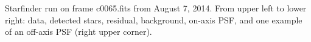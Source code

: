 Starfinder run on frame c0065.fits from August 7, 2014. From upper left to lower right: data, detected stars, residual, background, on-axis PSF, and one example of an off-axis PSF (right upper corner).
  